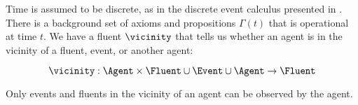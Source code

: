 Time is assumed to be discrete, as in the
discrete event calculus presented in \cite{mueller_commonsense_2014}.  There is a
background set of axioms and propositions $\Gamma(t)$ that is
operational at time $t$.  We have a fluent $\vicinity$ that tells us
whether an agent is in the vicinity of a fluent, event, or another
agent:

$$\vicinity: \Agent \times \Fluent \cup \Event \cup \Agent \rightarrow
\Fluent $$

Only events and fluents in the vicinity of an agent can be
observed by the agent.

\begin{comment}
For the cognitive condition $\mathcal{C}$ above, we have the following
concrete requirements that we implement in our system.  Later, we give
examples of these requirements in action.

  \begin{footnotesize}
    \begin{mdframed}[frametitle= Formal Requirements for $\mathcal{C}$ ,
      frametitlebackgroundcolor=gray!25, nobreak,
      linecolor=white,backgroundcolor=gray!10]
      Assume $\Gamma \vdash t < t + \Delta$
      \begin{enumerate}
      \item[$\mathbf{C}^f_1:$] It is common knowledge that, if an
        agent $x$ has a false belief, $\gamma$ informs the agent of
        the belief:\footnote{Please note that inference in \DCEC\ is
          non-monotonic as it includes the event calculus, which is
          non-monotonic.  If an agent $a$ believes $\phi$ based on
          prior information, adding new information can cause the
          agent to not believe $\phi$.}
         \begin{equation*}
          \common\color{gray!80}\left(\color{black}t, \left[\begin{aligned}
                &  \believes(\gamma, t, \phi) \land \believes(\gamma, t,
                \believes\big(x, t, \lnot \phi)\big)
                \\ & \hspace{50pt} \rightarrow \\
                & \hspace{30pt}\says(\gamma, x, t + \Delta, \phi)
              \end{aligned}\right]\color{gray!80}\right)\color{black}
        \end{equation*}


\end{comment}
